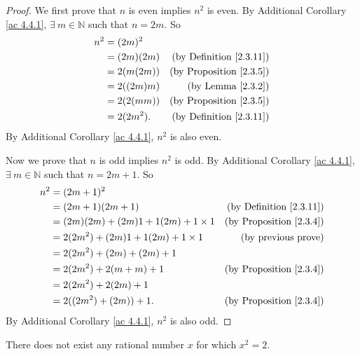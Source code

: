 \begin{proof}
We first prove that \(n\) is even implies \(n^2\) is even.
By Additional Corollary \ref{ac 4.4.1}, \(\exists\ m \in \mathds{N}\) such that \(n = 2m\).
So
\begin{align*}
n^2 &= (2m)^2 \\
&= (2m)(2m) & \text{(by Definition \ref{2.3.11})} \\
&= 2(m(2m)) & \text{(by Proposition \ref{2.3.5})} \\
&= 2((2m)m) & \text{(by Lemma \ref{2.3.2})} \\
&= 2(2(mm)) & \text{(by Proposition \ref{2.3.5})} \\
&= 2(2m^2). & \text{(by Definition \ref{2.3.11})}
\end{align*}
By Additional Corollary \ref{ac 4.4.1}, \(n^2\) is also even.

Now we prove that \(n\) is odd implies \(n^2\) is odd.
By Additional Corollary \ref{ac 4.4.1}, \(\exists\ m \in \mathds{N}\) such that \(n = 2m + 1\).
So
\begin{align*}
n^2 &= (2m + 1)^2 \\
&= (2m + 1)(2m + 1) & \text{(by Definition \ref{2.3.11})} \\
&= (2m)(2m) + (2m)1 + 1(2m) + 1 \times 1 & \text{(by Proposition \ref{2.3.4})} \\
&= 2(2m^2) + (2m)1 + 1(2m) + 1 \times 1 & \text{(by previous prove)} \\
&= 2(2m^2) + (2m) + (2m) + 1 \\
&= 2(2m^2) + 2(m + m) + 1 & \text{(by Proposition \ref{2.3.4})} \\
&= 2(2m^2) + 2(2m) + 1 \\
&= 2((2m^2) + (2m)) + 1. & \text{(by Proposition \ref{2.3.4})} \\
\end{align*}
By Additional Corollary \ref{ac 4.4.1}, \(n^2\) is also odd.
\end{proof}

\begin{proposition}\label{4.4.4}
There does not exist any rational number \(x\) for which \(x^2 = 2\).
\end{proposition}


